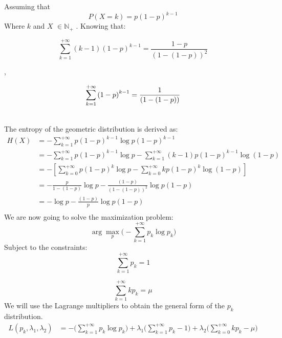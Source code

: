 \documentclass[11pt]{article}
\makeatletter
\newcommand{\Lagr}{L}
\newenvironment{proofw}{\par
	\pushQED{\qed}%
	\normalfont \topsep6\p@\@plus6\p@\relax
	\trivlist
	\item[]\ignorespaces
}{%
	\popQED\endtrivlist\@endpefalse
}
\makeatother
\begin{document}
\begin{proofw}
Assuming that	
\begin{equation*}
P(X= k) = {p(1 - p)}^{k-1}
\end{equation*}
 Where $k$ and $X$  $\in\mathbb N_{+}$  . Knowing that:
 
\begin{minipage}{.5\linewidth}
	\begin{equation*}
	\sum_{k=1}^{+\infty} (k-1){(1-p)}^{k-1} = \frac{1-p}{{(1-(1-p))}^2}
	\end{equation*}
\end{minipage}
,
\begin{minipage}{.5\linewidth}
	\begin{equation*}
	\sum_{k=1}^{+\infty} {(1-p)}^{k-1} = \frac{1}{(1-(1-p))}\\
	\end{equation*}
\end{minipage}
 \\

The entropy of the geometric distribution is derived as: 
\begin{equation*} \label{}
\begin{split}
H(X) & = - \sum_{k=1}^{+\infty} {p(1-p)}^{k-1} \log p{(1-p)}^{k-1}\\
& = - \sum_{k=1}^{+\infty} {p(1-p)}^{k-1} \log p - \sum_{k=1}^{+\infty}(k-1){p(1-p)}^{k-1} \log (1-p)\\
& = - [\sum_{k=0}^{+\infty} {p(1-p)}^{k} \log p - \sum_{k=0}^{+\infty} k{p(1-p)}^{k} \log {(1-p)}]\\
& = -\frac{p}{1-(1-p)}\log p -\frac{(1-p)}{{(1-(1-p))}^2} \log p(1-p)\\
&= -\log p -\frac{(1-p)}{p} \log p(1-p)\\
\end{split}
\end{equation*}
We are now going to solve the maximization problem:
\begin{equation*} 
\arg \max_{p}\Big(-\sum_{k=1}^{+\infty}p_{k} \log p_{k}\Big)
\end{equation*}
Subject to the constraints: 
\begin{equation*}
\sum_{k=1}^{+\infty} p_{k} = 1
\end{equation*}

\begin{equation*}
\sum_{k=1}^{+\infty}kp_{k} = \mu
\end{equation*}
We will use the Lagrange multipliers to obtain the general form of the $p_{k}$ distribution.
\begin{equation*} 
\begin{split}
\Lagr(p_{k}, \lambda_{1}, \lambda_{2}) & = -\Big(\sum_{k=1}^{+\infty}p_{k} \log p_{k}\Big) + \lambda_{1}\Big(\sum_{k=1}^{+\infty} p_{k}-1\Big) + \lambda_{2}\Big(\sum_{k=0}^{+\infty}kp_{k}-\mu\Big)\\
\end{split}
\end{equation*}


\end{proofw}
\end{document}
